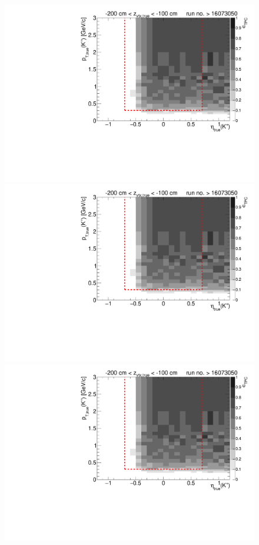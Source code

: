 \begin{figure}[hb]
{		\includegraphics[width=\linewidth,page=6]{graphics/eff/Eff2D_TPC_kaon_Plus_RunRange2.pdf}\\
		\includegraphics[width=\linewidth,page=8]{graphics/eff/Eff2D_TPC_kaon_Plus_RunRange2.pdf}\\
		\includegraphics[width=\linewidth,page=10]{graphics/eff/Eff2D_TPC_kaon_Plus_RunRange2.pdf}
	}%
\end{figure}
